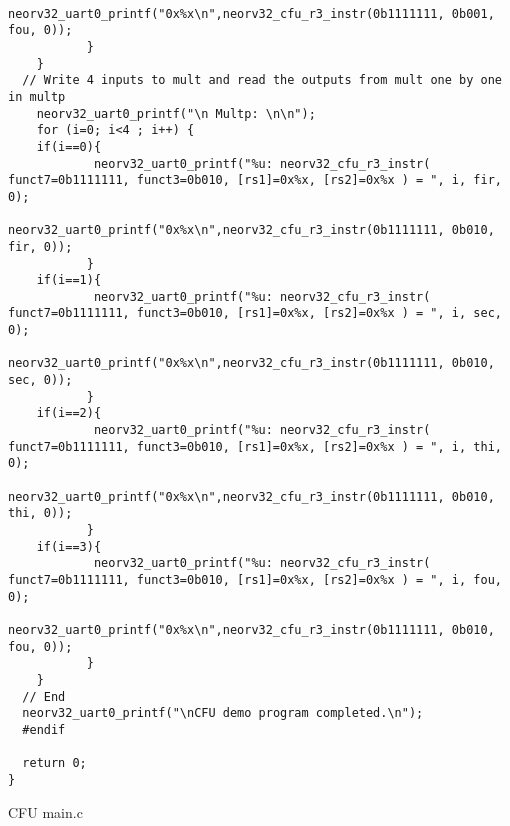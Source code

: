\begin{code}
\begin{verbatim}
            neorv32_uart0_printf("0x%x\n",neorv32_cfu_r3_instr(0b1111111, 0b001, fou, 0)); 
           }   
    } 
  // Write 4 inputs to mult and read the outputs from mult one by one in multp
    neorv32_uart0_printf("\n Multp: \n\n");
    for (i=0; i<4 ; i++) {
    if(i==0){
            neorv32_uart0_printf("%u: neorv32_cfu_r3_instr( funct7=0b1111111, funct3=0b010, [rs1]=0x%x, [rs2]=0x%x ) = ", i, fir, 0);
            neorv32_uart0_printf("0x%x\n",neorv32_cfu_r3_instr(0b1111111, 0b010, fir, 0)); 
           } 
    if(i==1){
            neorv32_uart0_printf("%u: neorv32_cfu_r3_instr( funct7=0b1111111, funct3=0b010, [rs1]=0x%x, [rs2]=0x%x ) = ", i, sec, 0);
            neorv32_uart0_printf("0x%x\n",neorv32_cfu_r3_instr(0b1111111, 0b010, sec, 0));  
           }   
    if(i==2){
            neorv32_uart0_printf("%u: neorv32_cfu_r3_instr( funct7=0b1111111, funct3=0b010, [rs1]=0x%x, [rs2]=0x%x ) = ", i, thi, 0);
            neorv32_uart0_printf("0x%x\n",neorv32_cfu_r3_instr(0b1111111, 0b010, thi, 0));  
           }   
    if(i==3){
            neorv32_uart0_printf("%u: neorv32_cfu_r3_instr( funct7=0b1111111, funct3=0b010, [rs1]=0x%x, [rs2]=0x%x ) = ", i, fou, 0);
            neorv32_uart0_printf("0x%x\n",neorv32_cfu_r3_instr(0b1111111, 0b010, fou, 0)); 
           }   
    } 
  // End
  neorv32_uart0_printf("\nCFU demo program completed.\n");
  #endif

  return 0;
}
\end{verbatim}
\caption{CFU main.c}
\label{ap-cod:13}
\end{code}

